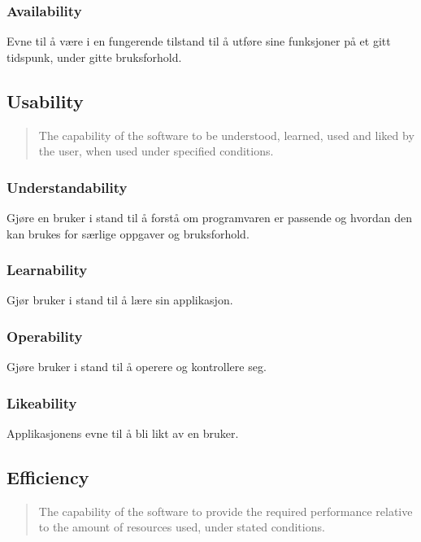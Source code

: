\subsubsection{Availability}

Evne til å være i en fungerende tilstand til å utføre sine funksjoner på
et gitt tidspunk, under gitte bruksforhold.

\subsection{Usability}

\begin{quote}
The capability of the software to be understood, learned, used and liked
by the user, when used under specified conditions.

\end{quote}
\subsubsection{Understandability}

Gjøre en bruker i stand til å forstå om programvaren er passende og
hvordan den kan brukes for særlige oppgaver og bruksforhold.

\subsubsection{Learnability}

Gjør bruker i stand til å lære sin applikasjon.

\subsubsection{Operability}

Gjøre bruker i stand til å operere og kontrollere seg.

\subsubsection{Likeability}

Applikasjonens evne til å bli likt av en bruker.

\subsection{Efficiency}

\begin{quote}
The capability of the software to provide the required performance
relative to the amount of resources used, under stated conditions.

\end{quote}
